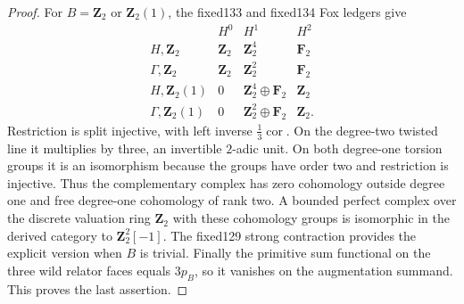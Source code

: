 \documentclass[11pt]{article}
\theoremstyle{definition}
\begin{document}
\begin{proof}
For $B=\mathbf Z_2$
or $\mathbf Z_2(1)$,
the fixed133 and
fixed134 Fox
ledgers give
\[
\begin{array}{c|ccc}
&H^0&H^1&H^2\\ \hline
H,\mathbf Z_2&
\mathbf Z_2&\mathbf Z_2^4&\mathbf F_2\\
\Gamma,\mathbf Z_2&
\mathbf Z_2&\mathbf Z_2^2&\mathbf F_2\\
H,\mathbf Z_2(1)&
0&\mathbf Z_2^4\oplus\mathbf F_2&\mathbf Z_2\\
\Gamma,\mathbf Z_2(1)&
0&\mathbf Z_2^2\oplus\mathbf F_2&\mathbf Z_2 .
\end{array}
\]
Restriction is
split injective,
with left inverse
$\tfrac13\operatorname{cor}$.
On the degree-two
twisted line it
multiplies by three,
an invertible
$2$-adic unit.
On both
degree-one
torsion groups
it is an
isomorphism
because the
groups have order
two and restriction
is injective.
Thus the complementary
complex has zero
cohomology outside
degree one and
free degree-one
cohomology of
rank two.
A bounded
perfect complex
over the discrete
valuation ring
$\mathbf Z_2$
with these
cohomology groups
is isomorphic
in the derived
category to
$\mathbf Z_2^2[-1]$.
The fixed129
strong contraction
provides the
explicit version
when $B$ is trivial.
Finally the
primitive
sum functional
on the three
wild relator
faces equals
$3p_B$, so it
vanishes on
the augmentation
summand.
This proves
the last assertion.
\end{proof}
\end{document}
